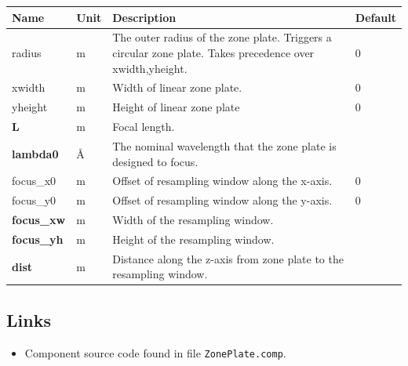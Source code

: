 \begin{longtable}{p{}p{}p{}p{}}
\toprule
\textbf{Name} & \textbf{Unit} & \textbf{Description} & \textbf{Default} \\
\midrule
\endhead
radius & m & The outer radius of the zone plate. Triggers a circular zone plate. Takes precedence over xwidth,yheight. & 0 \\
xwidth & m & Width of linear zone plate. & 0 \\
yheight & m & Height of linear zone plate & 0 \\
\textbf{L} & m & Focal length. &  \\
\textbf{lambda0} & \AA{} & The nominal wavelength that the zone plate is designed to focus. &  \\
focus\_x0 & m & Offset of resampling window along the x-axis. & 0 \\
focus\_y0 & m & Offset of resampling window along the y-axis. & 0 \\
\textbf{focus\_xw} & m & Width of the resampling window. &  \\
\textbf{focus\_yh} & m & Height of the resampling window. &  \\
\textbf{dist} & m & Distance along the z-axis from zone plate to the resampling window. &  \\
\bottomrule
\end{longtable}

\subsection*{Links}
\begin{itemize}
  \item Component source code found in file \texttt{ZonePlate.comp}.
\end{itemize}

